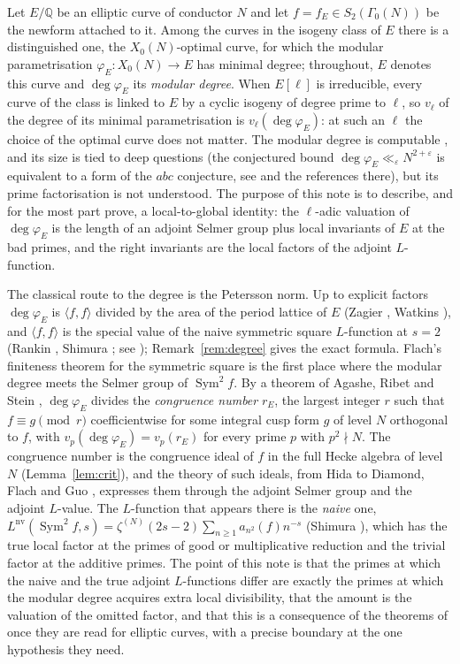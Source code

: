 \documentclass[11pt]{amsart}
\theoremstyle{definition}
\newcommand{\Q}{\mathbb{Q}}
\newcommand{\degphi}{\deg\varphi_E}
\newcommand{\Sym}{\operatorname{Sym}^2}
\newcommand{\nv}{\mathrm{nv}}
\begin{document}
Let $E/\Q$ be an elliptic curve of conductor $N$ and let $f=f_E\in S_2(\Gamma_0(N))$ be the newform attached to it. Among the curves in the isogeny class of $E$ there is a distinguished one, the $X_0(N)$-optimal curve, for which the modular parametrisation $\varphi_E\colon X_0(N)\to E$ has minimal degree; throughout, $E$ denotes this curve and $\degphi$ its \emph{modular degree}. When $E[\ell]$ is irreducible, every curve of the class is linked to $E$ by a cyclic isogeny of degree prime to $\ell$, so $v_\ell$ of the degree of its minimal parametrisation is $v_\ell(\degphi)$: at such an $\ell$ the choice of the optimal curve does not matter. The modular degree is computable \cite{Cremona97,Watkins02}, and its size is tied to deep questions (the conjectured bound $\degphi\ll_\varepsilon N^{2+\varepsilon}$ is equivalent to a form of the $abc$ conjecture, see \cite[\S2]{ARS12} and the references there), but its prime factorisation is not understood. The purpose of this note is to describe, and for the most part prove, a local-to-global identity: the $\ell$-adic valuation of $\degphi$ is the length of an adjoint Selmer group plus local invariants of $E$ at the bad primes, and the right invariants are the local factors of the adjoint $L$-function.

The classical route to the degree is the Petersson norm. Up to explicit factors $\degphi$ is $\langle f,f\rangle$ divided by the area of the period lattice of $E$ (Zagier \cite{Zagier85}, Watkins \cite{Watkins02}), and $\langle f,f\rangle$ is the special value of the naive symmetric square $L$-function at $s=2$ (Rankin \cite{Rankin39}, Shimura \cite{Shimura76}; see \cite[Lemma 2.12]{DFG04}); Remark~\ref{rem:degree} gives the exact formula. Flach's finiteness theorem for the symmetric square \cite{Flach92} is the first place where the modular degree meets the Selmer group of $\Sym f$. By a theorem of Agashe, Ribet and Stein \cite[Theorem 2.2]{ARS12}, $\degphi$ divides the \emph{congruence number} $r_E$, the largest integer $r$ such that $f\equiv g\pmod r$ coefficientwise for some integral cusp form $g$ of level $N$ orthogonal to $f$, with $v_p(\degphi)=v_p(r_E)$ for every prime $p$ with $p^2\nmid N$. The congruence number is the congruence ideal of $f$ in the full Hecke algebra of level $N$ (Lemma~\ref{lem:crit}), and the theory of such ideals, from Hida \cite{Hida81} to Diamond, Flach and Guo \cite{DFG04}, expresses them through the adjoint Selmer group and the adjoint $L$-value. The $L$-function that appears there is the \emph{naive} one, $L^{\nv}(\Sym f,s)=\zeta^{(N)}(2s-2)\sum_{n\ge1}a_{n^2}(f)n^{-s}$ (Shimura \cite{Shimura75}), which has the true local factor at the primes of good or multiplicative reduction and the trivial factor at the additive primes. The point of this note is that the primes at which the naive and the true adjoint $L$-functions differ are exactly the primes at which the modular degree acquires extra local divisibility, that the amount is the valuation of the omitted factor, and that this is a consequence of the theorems of \cite{DFG04} once they are read for elliptic curves, with a precise boundary at the one hypothesis they need.
\end{document}
